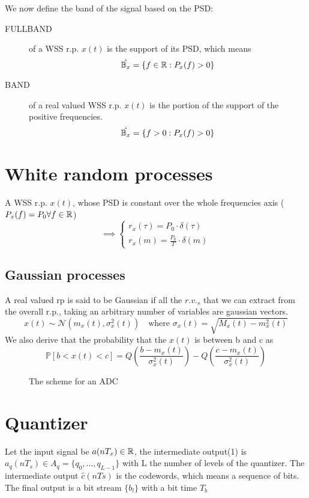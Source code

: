 We now define the band of the signal based on the PSD:

\begin{description}
  \item[FULLBAND] of a WSS r.p. $x(t)$ is the support of its PSD, which means
  $$\hat{\mathbb{B}_x} = \lbrace f \in \mathbb{R} : P_x(f)>0\rbrace$$
  \item[BAND] of a real valued WSS r.p. $x(t)$ is the portion of the support of the positive frequencies.
  $$\hat{\mathbb{B}_x} = \lbrace f>0 : P_x(f)>0\rbrace$$
\end{description}

\section{White random processes}
A WSS r.p. $x(t)$, whose PSD is constant over the whole frequencies axis ($P_x(f) = P_0 \forall f \in \mathbb{R}$)
\begin{equation}
  \implies
  \begin{cases}
    r_x(\tau) = P_0 \cdot \delta(\tau) \\
    r_x(m) = \frac{P_0}{T} \cdot \delta(m)
  \end{cases}
\end{equation}
\subsection{Gaussian processes}
A real valued rp is said to be Gaussian if all the $r.v._s$ that we can extract from the overall r.p., taking an arbitrary number of variables are gaussian vectors.
\begin{equation}
  x(t)\sim \mathcal{N} (m_x(t),\sigma^2_x(t)) \quad \text{where } \sigma_x(t) =  \sqrt{M_x(t)-m_x^2(t)}
\end{equation}
We also derive that the probability that the $x(t)$ is between b and c as
\begin{equation}
  \mathbb{P}[b<x(t)<c] = Q\left(\frac{b-m_x(t)}{\sigma_x^2(t)}\right)-Q\left(\frac{c-m_x(t)}{\sigma_x^2(t)}\right)
\end{equation}

\begin{figure} \centering
  
  \caption{The scheme for an ADC}
  \label{}
\end{figure}
\section{Quantizer}
Let the input signal be $a(n T_x) \in \mathbb{R}$, the intermediate output(1) is $a_q(nT_s) \in A_q = \lbrace q_0,\dots,q_{L-1} \rbrace$ with L the number of levels of the quantizer.
The intermediate output $\hat{c}(n Ts)$ is the codewords, which means a sequence of bits. The final output is a bit stream $\lbrace b_l \rbrace$ with a bit time $T_b$

